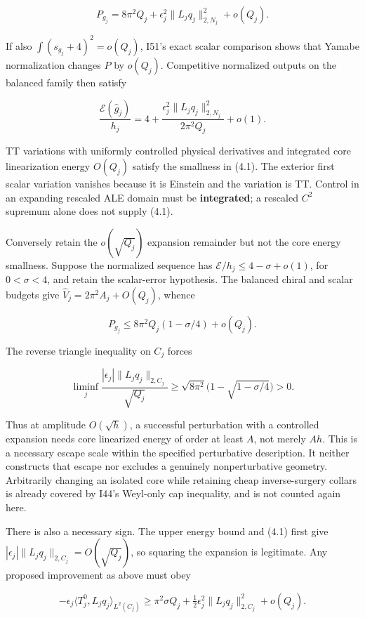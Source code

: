 \documentclass[
  10pt,
]{article}
\begin{document}
\[
 P_{g_j}=8\pi^2Q_j+
       \epsilon_j^2\|L_jq_j\|_{2,N_j}^2+o(Q_j). \tag{4.2}
\]

If also \(\int(s_{g_j}+4)^2=o(Q_j)\), I51's exact scalar comparison
shows that Yamabe normalization changes \(P\) by \(o(Q_j)\). Competitive
normalized outputs on the balanced family then satisfy

\[
 \frac{\mathcal E(\widehat g_j)}{h_j}
 =4+\frac{\epsilon_j^2\|L_jq_j\|_{2,N_j}^2}{2\pi^2Q_j}+o(1).
 \tag{4.3}
\]

TT variations with uniformly controlled physical derivatives and
integrated core linearization energy \(O(Q_j)\) satisfy the smallness in
(4.1). The exterior first scalar variation vanishes because it is
Einstein and the variation is TT. Control in an expanding rescaled ALE
domain must be \textbf{integrated}; a rescaled \(C^2\) supremum alone
does not supply (4.1).

Conversely retain the \(o(\sqrt{Q_j})\) expansion remainder but not the
core energy smallness. Suppose the normalized sequence has
\(\mathcal E/h_j\le4-\sigma+o(1)\), for \(0<\sigma<4\), and retain the
scalar-error hypothesis. The balanced chiral and scalar budgets give
\(\widehat V_j=2\pi^2A_j+O(Q_j)\), whence

\[
 P_{g_j}\le 8\pi^2Q_j(1-\sigma/4)+o(Q_j).
\]

The reverse triangle inequality on \(C_j\) forces

\[
 \boxed{\liminf_j
 \frac{|\epsilon_j|\|L_jq_j\|_{2,C_j}}{\sqrt{Q_j}}
 \ge\sqrt{8\pi^2}\bigl(1-\sqrt{1-\sigma/4}\bigr)>0.} \tag{4.4}
\]

Thus at amplitude \(O(\sqrt h)\), a successful perturbation with a
controlled expansion needs core linearized energy of order at least
\(A\), not merely \(Ah\). This is a necessary escape scale within the
specified perturbative description. It neither constructs that escape
nor excludes a genuinely nonperturbative geometry. Arbitrarily changing
an isolated core while retaining cheap inverse-surgery collars is
already covered by I44's Weyl-only cap inequality, and is not counted
again here.

There is also a necessary sign. The upper energy bound and (4.1) first
give \(|\epsilon_j|\|L_jq_j\|_{2,C_j}=O(\sqrt{Q_j})\), so squaring the
expansion is legitimate. Any proposed improvement as above must obey

\[
 -\epsilon_j\langle T_j^0,L_jq_j\rangle_{L^2(C_j)}
 \ge\pi^2\sigma Q_j
        +\tfrac12\epsilon_j^2\|L_jq_j\|_{2,C_j}^2+o(Q_j).
 \tag{4.5}
\]
\end{document}
